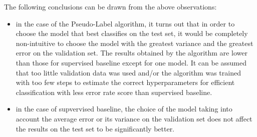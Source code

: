 \documentclass[12pt]{article}
\theoremstyle{definition}
\DeclareRobustCommand{\[}{\begin{equation}}
\DeclareRobustCommand{\]}{\end{equation}}
\begin{document}
\vspace{5mm} %
The following conclusions can be drawn from the above observations:
    \begin{itemize}
        \item in the case of the Pseudo-Label algorithm, it turns out that in order to choose the model that best classifies on the test set, it would be completely non-intuitive to choose the model with the greatest variance and the greatest error on the validation set. The results obtained by the algorithm are lower than those for supervised baseline except for one model. It can be assumed that too little validation data was used and/or the algorithm was trained with too few steps to estimate the correct hyperparameters for efficient classification with less error rate score than supervised baseline.
        \item in the case of supvervised baseline, the choice of the model taking into account the average error or its variance on the validation set does not affect the results on the test set to be significantly better.
    \end{itemize}
\end{document}
